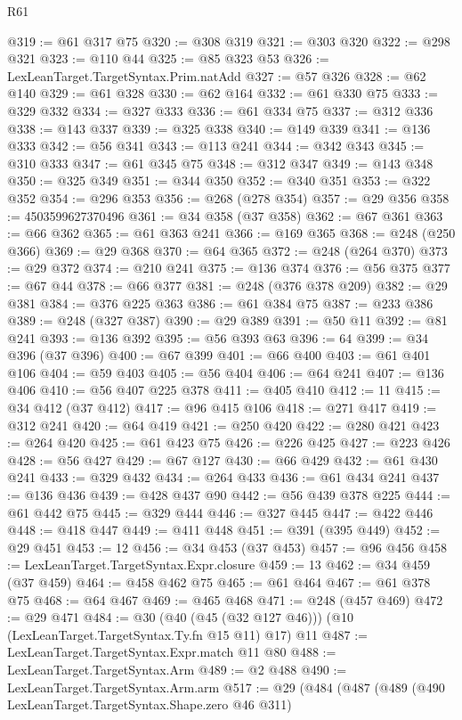 \begin{lexlean}{R61}
\begin{coremodule}
@319 := @61 @317 @75
@320 := @308 @319
@321 := @303 @320
@322 := @298 @321
@323 := @110 @44
@325 := @85 @323 @53
@326 := LexLeanTarget.TargetSyntax.Prim.natAdd
@327 := @57 @326
@328 := @62 @140
@329 := @61 @328
@330 := @62 @164
@332 := @61 @330 @75
@333 := @329 @332
@334 := @327 @333
@336 := @61 @334 @75
@337 := @312 @336
@338 := @143 @337
@339 := @325 @338
@340 := @149 @339
@341 := @136 @333
@342 := @56 @341
@343 := @113 @241
@344 := @342 @343
@345 := @310 @333
@347 := @61 @345 @75
@348 := @312 @347
@349 := @143 @348
@350 := @325 @349
@351 := @344 @350
@352 := @340 @351
@353 := @322 @352
@354 := @296 @353
@356 := @268 (@278 @354)
@357 := @29 @356
@358 := 4503599627370496
@361 := @34 @358 (@37 @358)
@362 := @67 @361
@363 := @66 @362
@365 := @61 @363 @241
@366 := @169 @365
@368 := @248 (@250 @366)
@369 := @29 @368
@370 := @64 @365
@372 := @248 (@264 @370)
@373 := @29 @372
@374 := @210 @241
@375 := @136 @374
@376 := @56 @375
@377 := @67 @44
@378 := @66 @377
@381 := @248 (@376 @378 @209)
@382 := @29 @381
@384 := @376 @225 @363
@386 := @61 @384 @75
@387 := @233 @386
@389 := @248 (@327 @387)
@390 := @29 @389
@391 := @50 @11
@392 := @81 @241
@393 := @136 @392
@395 := @56 @393 @63
@396 := 64
@399 := @34 @396 (@37 @396)
@400 := @67 @399
@401 := @66 @400
@403 := @61 @401 @106
@404 := @59 @403
@405 := @56 @404
@406 := @64 @241
@407 := @136 @406
@410 := @56 @407 @225 @378
@411 := @405 @410
@412 := 11
@415 := @34 @412 (@37 @412)
@417 := @96 @415 @106
@418 := @271 @417
@419 := @312 @241
@420 := @64 @419
@421 := @250 @420
@422 := @280 @421
@423 := @264 @420
@425 := @61 @423 @75
@426 := @226 @425
@427 := @223 @426
@428 := @56 @427
@429 := @67 @127
@430 := @66 @429
@432 := @61 @430 @241
@433 := @329 @432
@434 := @264 @433
@436 := @61 @434 @241
@437 := @136 @436
@439 := @428 @437 @90
@442 := @56 @439 @378 @225
@444 := @61 @442 @75
@445 := @329 @444
@446 := @327 @445
@447 := @422 @446
@448 := @418 @447
@449 := @411 @448
@451 := @391 (@395 @449)
@452 := @29 @451
@453 := 12
@456 := @34 @453 (@37 @453)
@457 := @96 @456
@458 := LexLeanTarget.TargetSyntax.Expr.closure
@459 := 13
@462 := @34 @459 (@37 @459)
@464 := @458 @462 @75
@465 := @61 @464
@467 := @61 @378 @75
@468 := @64 @467
@469 := @465 @468
@471 := @248 (@457 @469)
@472 := @29 @471
@484 := @30 (@40 (@45 (@32 @127 @46))) (@10 (LexLeanTarget.TargetSyntax.Ty.fn @15 @11) @17) @11
@487 := LexLeanTarget.TargetSyntax.Expr.match @11 @80
@488 := LexLeanTarget.TargetSyntax.Arm
@489 := @2 @488
@490 := LexLeanTarget.TargetSyntax.Arm.arm
@517 := @29
    (@484
      (@487
        (@489
          (@490 LexLeanTarget.TargetSyntax.Shape.zero @46 @311)

\end{coremodule}
\end{lexlean}

